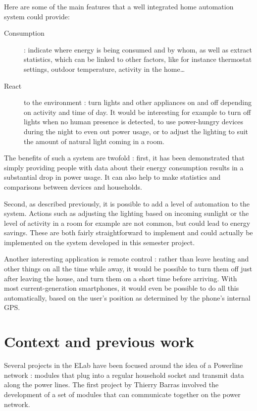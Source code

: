 Here are some of the main features that a well integrated home automation system
could provide:
\begin{description}
  \item[Consumption] : indicate where energy is being consumed and by whom, as
    well as extract statistics, which can be linked to other factors, like for
    instance thermostat settings, outdoor temperature, activity in the
    home\ldots
  \item[React] to the environment : turn lights and other appliances on and off
    depending on activity and time of day. It would be interesting for example
    to turn off lights when no human presence is detected, to use power-hungry
    devices during the night to even out power usage, or to adjust the lighting
    to suit the amount of natural light coming in a room. 
\end{description}

The benefits of such a system are twofold : first, it has been
demonstrated\cite{darby2006} that simply providing people with data about their
energy consumption results in a substantial drop in power usage. It can also
help to make statistics and comparisons between devices and households.

Second, as described previously, it is possible to add a level of automation to
the system. Actions such as adjusting the lighting based on incoming sunlight or
the level of activity in a room for example are not common, but could lead to
energy savings. These are both fairly straightforward to implement and could
actually be implemented on the system developed in this semester project.

Another interesting application is remote control : rather than leave heating
and other things on all the time while away, it would be possible to turn them
off just after leaving the house, and turn them on a short time before arriving.
With most current-generation smartphones, it would even be possible to do all
this automatically, based on the user's position as determined by the phone's
internal GPS.


\section{Context and previous work}

Several projects in the ELab have been focused around the idea of a Powerline
network : modules that plug into a regular household socket and transmit data
along the power lines. The first project by Thierry Barras\cite{barras2009}
involved the development of a set of modules that can communicate together on
the power network.

